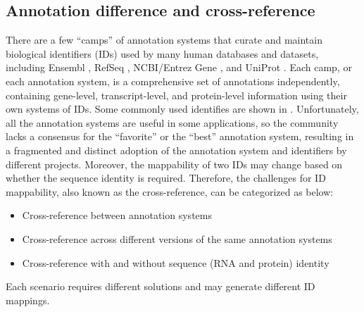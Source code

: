 \subsection{Annotation difference and cross-reference}
There are a few ``camps'' of annotation systems that curate and maintain biological identifiers (IDs) used by many human databases and datasets, including Ensembl \cite{howekl_flicekp:Ensembl20212021}, RefSeq \cite{olearyna_pruittkd:ReferenceSequence2016}, NCBI/Entrez Gene \cite{maglottd_tatusovat:EntrezGene2011}, and UniProt \cite{batemana_zhangj:UniProtUniversal2017}.
Each camp, or each annotation system, is a comprehensive set of annotations independently, containing gene-level, transcript-level, and protein-level information using their own systems of IDs.
Some commonly used identifies are shown in .
Unfortunately, all the annotation systems are useful in some applications, so the community lacks a consensus for the ``favorite'' or the ``best'' annotation system, resulting in a fragmented and distinct adoption of the annotation system and identifiers by different projects.
Moreover, the mappability of two IDs may change based on whether the sequence identity is required.
Therefore, the challenges for ID mappability, also known as the cross-reference, can be categorized as below:
\begin{itemize}
    \item Cross-reference between annotation systems
    \item Cross-reference across different versions of the same annotation systems
    \item Cross-reference with and without sequence (RNA and protein) identity
\end{itemize}
Each scenario requires different solutions and may generate different ID mappings.

